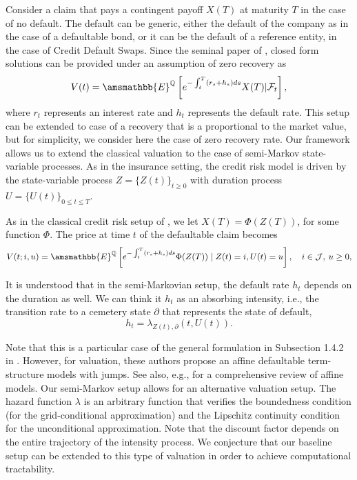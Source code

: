 \documentclass[11pt,leqno]{amsart}
\numberwithin{table}{section}
\numberwithin{figure}{section}
\numberwithin{equation}{section}
\newcommand{\1}{{\mathds{1}}}
\newcommand{\0}{\mat{0}}
\newcommand{\E}{\amsmathbb{E}}
\begin{document}
{Consider a claim that pays a contingent payoff $X(T)$ at maturity $T$ in the case of no default. The default can be generic, either the default of the company as in the case of a defaultable  bond, or it can be the default of a reference entity, in the case of Credit Default Swaps. Since the seminal paper of \cite{duffie1999modeling}, closed form solutions can be provided under an assumption of  zero recovery as
\begin{equation}
V(t) = \E^{\mathbb Q} \left[ e^{-\int_t^T (r_s + h_s) ds} X(T) |  \mathcal{F}_t \right],
\end{equation}
where $r_t$ represents an interest rate and $h_t$ represents the default rate. This setup can be extended to case of a recovery  that is a proportional to the market value, but for simplicity, we consider here the case of zero recovery rate.
Our framework allows us to extend the classical valuation to the case of semi-Markov state-variable processes. 
As in the insurance setting, the credit risk model is driven by the state-variable process $Z=\{Z(t)\}_{t\ge 0}$ with duration process  $U=\{U(t)\}_{0\le t\le T}$.


As in the classical credit risk setup of  \cite{duffie1999modeling}, we let $X(T) = \Phi(Z(T))$, for some function $\Phi$. The price at time $t$ of the defaultable claim becomes
\[ V(t;i,u)=\E^{\mathbb Q}\left[e^{-\int_t^T (r_s + h_s) ds } \Phi(Z(T)) \mid Z(t)=i,U(t)=u\right],\quad i\in\mathcal{J},\: u\ge0, \]

It is understood that in the semi-Markovian setup, the default  rate $h_t$ depends on the duration as well. We can think it $h_t$ as an absorbing intensity, i.e., the transition rate to a cemetery state $\partial$ that represents the state of default,
\begin{equation}
h_t = \lambda_{Z(t), \partial}(t, U(t)).
\end{equation} 

{
Note that this is a particular case of the general formulation in Subsection 1.4.2  in \cite{duffie1999modeling}. However, for valuation, these authors propose an affine defaultable term-structure models with jumps. See also, e.g., \cite{duffie2004credit} for a comprehensive review of affine models.}
Our semi-Markov setup allows for an alternative valuation setup. The hazard function $\lambda$ is an arbitrary  function that verifies the boundedness condition (for the grid-conditional approximation) and the Lipschitz continuity condition for the unconditional approximation. 
Note that the discount factor depends on the entire trajectory of the intensity process. We conjecture that our baseline setup can be extended to this type of valuation in order to achieve  computational tractability.



}
\end{document}
